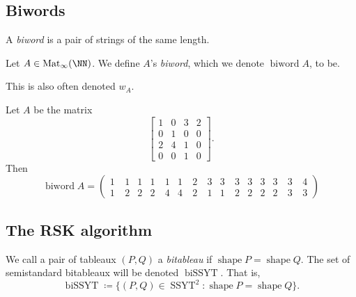 \documentclass{article}
\DeclareMathOperator{\shape}{shape}
\DeclareMathOperator{\SSYT}{SSYT}
\DeclareMathOperator{\biSSYT}{biSSYT}
\DeclareMathOperator{\Mat}{Mat}
\DeclareMathOperator{\biword}{biword}
\begin{document}
\subsection{Biwords}

\begin{definition}
    A \textit{biword} is a pair of strings of the same length.
\end{definition}

\begin{definition}
    Let $A \in \Mat_\infty(\NN)$.
    We define $A$'s \textit{biword}, which we denote $\biword A$, to be.

    This is also often denoted $w_A$.
\end{definition}

\begin{example}
    Let $A$ be the matrix
    \[
        \begin{bmatrix}
            1 & 0 & 3 & 2 \\
            0 & 1 & 0 & 0 \\
            2 & 4 & 1 & 0 \\
            0 & 0 & 1 & 0
        \end{bmatrix}.
    \]
    Then 
    \[
        \biword A = \begin{pmatrix}
            1 & 1 & 1 & 1 & 1 & 1 \
              & 2 \
              & 3 & 3 & 3 & 3 & 3 & 3 & 3\
              & 4 \\
            1 \
              & 2 & 2 & 2 \
              & 4 & 4 \
              & 2 \
              & 1 & 1 \
              & 2 & 2 & 2 & 2 \
              & 3 \
              & 3
        \end{pmatrix}
    \]
\end{example}

\subsection{The RSK algorithm}

\begin{definition}
    We call a pair of tableaux $(P,Q)$ a \textit{bitableau} if $\shape P = \shape Q$.
    The set of semistandard bitableaux will be denoted $\biSSYT$.
    That is,
    \[
        \biSSYT \coloneq \{(P,Q) \in \SSYT^2 : \shape P = \shape Q\}.
    \]
\end{definition}
\end{document}
